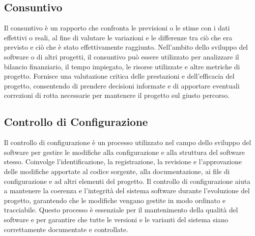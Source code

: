 \subsection{Consuntivo}
Il consuntivo è un rapporto che confronta le previsioni o le stime con i dati
effettivi o reali, al fine di valutare le variazioni e le differenze tra ciò
che era previsto e ciò che è stato effettivamente raggiunto. Nell'ambito dello
sviluppo del software o di altri progetti, il consuntivo può essere utilizzato
per analizzare il bilancio finanziario, il tempo impiegato, le risorse
utilizzate e altre metriche di progetto. Fornisce una valutazione critica delle
prestazioni e dell'efficacia del progetto, consentendo di prendere decisioni
informate e di apportare eventuali correzioni di rotta necessarie per mantenere
il progetto sul giusto percorso.
\subsection{Controllo di Configurazione}
Il controllo di configurazione è un processo utilizzato nel campo dello
sviluppo del software per gestire le modifiche alla configurazione e alla
struttura del software stesso. Coinvolge l'identificazione, la registrazione,
la revisione e l'approvazione delle modifiche apportate al codice sorgente,
alla documentazione, ai file di configurazione e ad altri elementi del
progetto. Il controllo di configurazione aiuta a mantenere la coerenza e
l'integrità del sistema software durante l'evoluzione del progetto, garantendo
che le modifiche vengano gestite in modo ordinato e tracciabile. Questo
processo è essenziale per il mantenimento della qualità del software e per
garantire che tutte le versioni e le varianti del sistema siano correttamente
documentate e controllate.

